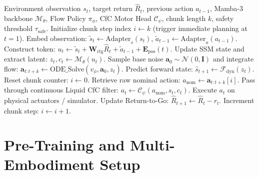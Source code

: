 \documentclass{article}
\begin{document}
\begin{algorithm}[tb]
\caption{HDML Dual-Rate Inference with PACE Safety Watchdog}
\label{alg:hdml_inference}
\begin{algorithmic}[1]
\REQUIRE Environment observation $s_t$, target return $\hat{R}_t$, previous action $a_{t-1}$, Mamba-3 backbone $\mathcal{M}_\theta$, Flow Policy $\pi_\phi$, CfC Motor Head $\mathcal{C}_\psi$, chunk length $k$, safety threshold $\tau_{\text{safe}}$.
\STATE Initialize chunk step index $i \leftarrow k$ (trigger immediate planning at $t=1$).
        \STATE Embed observation: $\tilde{s}_t \leftarrow \text{Adapter}_s(s_t)$, $\tilde{a}_{t-1} \leftarrow \text{Adapter}_a(a_{t-1})$.
        \STATE Construct token: $u_t \leftarrow \tilde{s}_t + \mathbf{W}_{\text{rtg}} \hat{R}_t + \tilde{a}_{t-1} + \mathbf{E}_{\text{pos}}(t)$.
        \STATE Update SSM state and extract latent: $z_t, c_t \leftarrow \mathcal{M}_\theta(u_t)$.
        \STATE Sample base noise $\mathbf{a}_0 \sim \mathcal{N}(0, \mathbf{I})$ and integrate flow: $\mathbf{a}_{t:t+k} \leftarrow \text{ODE\_Solve}(v_\phi, \mathbf{a}_0, z_t)$.
        \STATE Predict forward state: $\hat{s}_{t+1} \leftarrow \mathcal{F}_{\text{dyn}}(z_t)$.
        \STATE Reset chunk counter: $i \leftarrow 0$.
    \ENDIF
    \STATE Retrieve raw nominal action: $a_{\text{nom}} \leftarrow \mathbf{a}_{t:t+k}[i]$.
    \STATE Pass through continuous Liquid CfC filter: $a_t \leftarrow \mathcal{C}_\psi(a_{\text{nom}}, s_t, c_t)$.
    \STATE Execute $a_t$ on physical actuators / simulator.
    \STATE Update Return-to-Go: $\hat{R}_{t+1} \leftarrow \hat{R}_t - r_t$.
    \STATE Increment chunk step: $i \leftarrow i + 1$.
\ENDFOR
\end{algorithmic}
\end{algorithm}

\section{Pre-Training and Multi-Embodiment Setup}
\label{sec:setup}
\end{document}
